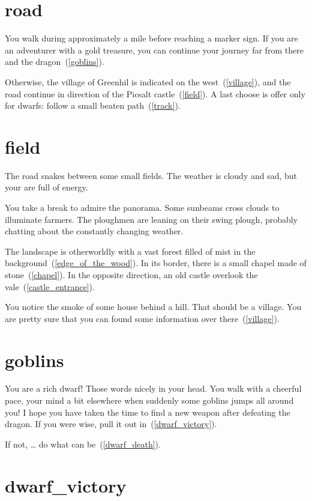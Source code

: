 \section{road}

You walk during approximately a mile before reaching a marker sign. If you are
an adventurer with a gold treasure, you can continue your journey far from there and
the dragon~(\ref{goblins}).

Otherwise, the village of Greenhil is indicated on the west~(\ref{village}), and
the road continue in direction of the Picsalt castle~(\ref{field}). A last
choose is offer only for dwarfs: follow a small beaten path~(\ref{track}).

\section{field}

The road snakes between some small fields. The weather is cloudy and sad, but
your are full of energy.

You take a break to admire the panorama. Some sunbeams cross clouds to
illuminate farmers. The ploughmen are leaning on their swing plough, probably
chatting about the constantly changing weather.

The landscape is otherworldly with a vast forest filled of mist in the
background~(\ref{edge_of_the_wood}). In its border, there is a small chapel made
of stone~(\ref{chapel}). In the opposite direction, an old castle overlook the
vale~(\ref{castle_entrance}).

You notice the smoke of some house behind a hill. That should be a village. You
are pretty sure that you can found some information over there~(\ref{village}).


\section{goblins}

You are a rich dwarf! Those words nicely in your head. You walk with a cheerful
pace, your mind a bit elsewhere when suddenly some goblins jumps all around
you! I hope you have taken the time to find a new weapon after defeating the dragon. If
you were wise, pull it out in~(\ref{dwarf_victory}).

If not, … do what can be~(\ref{dwarf_death}).

\section{dwarf_victory}

